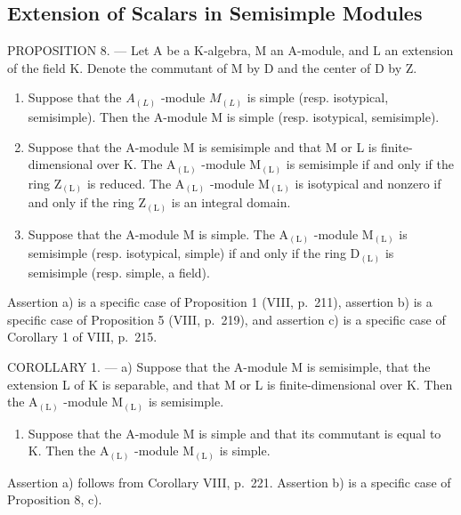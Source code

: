 \subsection{Extension of Scalars in Semisimple Modules}

PROPOSITION 8. --- Let A be a K-algebra, M an A-module, and L an extension of the field K. Denote the commutant of M by D and the center of D by Z.

\begin{enumerate}
\def\labelenumi{\alph{enumi})}
\item
  Suppose that the \(A_{(L)}\) -module \(M_{(L)}\) is simple (resp. isotypical, semisimple). Then the A-module M is simple (resp. isotypical, semisimple).
\item
  Suppose that the A-module M is semisimple and that M or L is finite-dimensional over K. The \(\mathrm{A}_{(\mathrm{L})}\) -module \(\mathrm{M}_{(\mathrm{L})}\) is semisimple if and only if the ring \(\mathrm{Z}_{(\mathrm{L})}\) is reduced. The \(\mathrm{A}_{(\mathrm{L})}\) -module \(\mathrm{M}_{(\mathrm{L})}\) is isotypical and nonzero if and only if the ring \(\mathrm{Z}_{(\mathrm{L})}\) is an integral domain.
\item
  Suppose that the A-module M is simple. The \(\mathrm{A}_{(\mathrm{L})}\) -module \(\mathrm{M}_{(\mathrm{L})}\) is semisimple (resp. isotypical, simple) if and only if the ring \(\mathrm{D}_{(\mathrm{L})}\) is semisimple (resp. simple, a field).
\end{enumerate}

Assertion a) is a specific case of Proposition 1 (VIII, p.~211), assertion b) is a specific case of Proposition 5 (VIII, p.~219), and assertion c) is a specific case of Corollary 1 of VIII, p.~215.

COROLLARY 1. --- a) Suppose that the A-module M is semisimple, that the extension L of K is separable, and that M or L is finite-dimensional over K. Then the \(\mathrm{A}_{(\mathrm{L})}\) -module \(\mathrm{M}_{(\mathrm{L})}\) is semisimple.

\begin{enumerate}
\def\labelenumi{\alph{enumi})}
\setcounter{enumi}{1}
\tightlist
\item
  Suppose that the A-module M is simple and that its commutant is equal to K. Then the \(\mathrm{A}_{(\mathrm{L})}\) -module \(\mathrm{M}_{(\mathrm{L})}\) is simple.
\end{enumerate}

Assertion a) follows from Corollary VIII, p.~221. Assertion b) is a specific case of Proposition 8, c).

